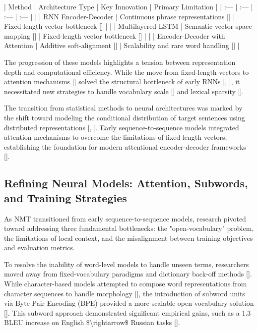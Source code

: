 \documentclass[11pt]{article}
\begin{document}
| Method | Architecture Type | Key Innovation | Primary Limitation |
| :--- | :--- | :--- | :--- |
| \citep{1406.1078} | RNN Encoder-Decoder | Continuous phrase representations [\citep{1406.1078}] | Fixed-length vector bottleneck [\citep{1409.0473}] |
| \citep{1409.3215} | Multilayered LSTM | Semantic vector space mapping [\citep{1409.3215}] | Fixed-length vector bottleneck [\citep{1409.0473}] |
| \citep{1409.0473} | Encoder-Decoder with Attention | Additive soft-alignment [\citep{1409.0473}] | Scalability and rare word handling [\citep{1409.0473}] |

The progression of these models highlights a tension between representation depth and computational efficiency. While the move from fixed-length vectors to attention mechanisms [\citep{1409.0473}] solved the structural bottleneck of early RNNs [\citep{1406.1078}, \citep{1409.3215}], it necessitated new strategies to handle vocabulary scale [\citep{1412.2007}] and lexical sparsity [\citep{1410.8206}].

The transition from statistical methods to neural architectures was marked by the shift toward modeling the conditional distribution of target sentences using distributed representations [\citep{1912.02047}, \citep{2012.15515}]. Early sequence-to-sequence models integrated attention mechanisms to overcome the limitations of fixed-length vectors, establishing the foundation for modern attentional encoder-decoder frameworks [\citep{1709.07809}].
\subsection{Refining Neural Models: Attention, Subwords, and Training Strategies}

As NMT transitioned from early sequence-to-sequence models, research pivoted toward addressing three fundamental bottlenecks: the "open-vocabulary" problem, the limitations of local context, and the misalignment between training objectives and evaluation metrics.

To resolve the inability of word-level models to handle unseen terms, researchers moved away from fixed-vocabulary paradigms and dictionary back-off methods [\citep{1508.07909}]. While character-based models attempted to compose word representations from character sequences to handle morphology [\citep{1511.04586}], the introduction of subword units via Byte Pair Encoding (BPE) provided a more scalable open-vocabulary solution [\citep{1508.07909}]. This subword approach demonstrated significant empirical gains, such as a 1.3 BLEU increase on English \$\textbackslash{}rightarrow\$ Russian tasks [\citep{1508.07909}].
\end{document}
